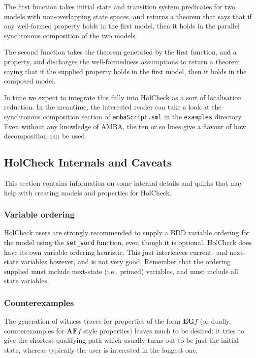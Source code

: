 \documentclass[12pt,fleqn]{article}
\newcommand{\hc}{HolCheck}
\begin{document}
The first function takes initial state and transition system predicates for two models with non-overlapping state spaces, and returns a theorem that says that if any well-formed property holds in the first model, then it holds in the parallel synchronous composition of the two models.

The second function takes the theorem generated by the first function, and a property, and discharges the well-formedness assumptions to return a theorem saying that if the supplied property holds in the first model, then it holds in the composed model.

In time we expect to integrate this fully into \hc{} as a sort of localisation reduction. In the meantime, the interested reader can take a look at the synchronous composition section of \texttt{ambaScript.sml} in the \texttt{examples} directory. Even without any knowledge of AMBA, the ten or so lines give a flavour of how decomposition can be used.

\subsection{\hc{} Internals and Caveats}

This section contains information on some internal details and quirks that may help with creating models and properties for \hc{}.

\subsubsection{Variable ordering}

\hc{} users are strongly recommended to supply a BDD variable ordering for the model using the \texttt{set\_vord} function, even though it is optional. \hc{} does have its own variable ordering heuristic. This just interleaves current- and next-state variables however, and is not very good. Remember that the ordering supplied must include next-state (i.e., primed) variables, and must include all state variables.

\subsubsection{Counterexamples}

The generation of witness traces for properties of the form \(\mathbf{EG} f \) (or dually, counterexamples for \(\mathbf{AF} f \) style properties) leaves much to be desired: it tries to give the shortest qualifying path which usually turns out to be just the initial state, whereas typically the user is interested in the longest one.
\end{document}
